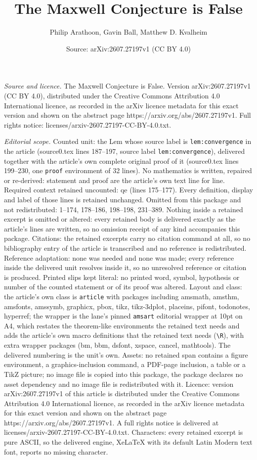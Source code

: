 \documentclass[10pt,a4paper]{amsart}
\title[The Maxwell Conjecture is False]{The Maxwell Conjecture is False}
\author{Philip Arathoon, Gavin Ball, Matthew D. Kvalheim}
\date{Source: arXiv:2607.27197v1 (CC BY 4.0)}
\begin{document}
\maketitle

\noindent\emph{Source and licence.} The Maxwell Conjecture is False. Version arXiv:2607.27197v1 (CC BY 4.0), distributed under the Creative Commons Attribution 4.0 International licence, as recorded in the arXiv licence metadata for this exact version and shown on the abstract page https://arxiv.org/abs/2607.27197v1. Full rights notice: licenses/arxiv-2607.27197-CC-BY-4.0.txt.\par\smallskip

\noindent\textit{Editorial scope.} Counted unit: the Lem whose source label is \texttt{lem:convergence} in the article (source0.tex lines 187--197, source label \texttt{lem:convergence}), delivered together with the article's own complete original proof of it (source0.tex lines 199--230, one \texttt{proof} environment of 32 lines). No mathematics is written, repaired or re-derived: statement and proof are the article's own text line for line. Required context retained uncounted: qe (lines 175--177). Every definition, display and label of those lines is retained unchanged. Omitted from this package and not redistributed: 1--174, 178--186, 198--198, 231--389. Nothing inside a retained excerpt is omitted or altered: every retained body is delivered exactly as the article's lines are written, so no omission receipt of any kind accompanies this package. Citations: the retained excerpts carry no citation command at all, so no bibliography entry of the article is transcribed and no reference is redistributed. Reference adaptation: none was needed and none was made; every reference inside the delivered unit resolves inside it, so no unresolved reference or citation is produced. Printed slips kept literal: no printed word, symbol, hypothesis or number of the counted statement or of its proof was altered. Layout and class: the article's own class is \texttt{article} with packages including amsmath, amsthm, amsfonts, amssymb, graphicx, pbox, tikz, tikz-3dplot, placeins, pifont, todonotes, hyperref; the wrapper is the lane's pinned \texttt{amsart} editorial wrapper at 10pt on A4, which restates the theorem-like environments the retained text needs and adds the article's own macro definitions that the retained text needs (\texttt{\textbackslash R}), with extra wrapper packages (bm, bbm, dsfont, xspace, cancel, mathtools). The delivered numbering is the unit's own. Assets: no retained span contains a figure environment, a graphics-inclusion command, a PDF-page inclusion, a table or a TikZ picture; no image file is copied into this package, the package declares no asset dependency and no image file is redistributed with it. Licence: version arXiv:2607.27197v1 of this article is distributed under the Creative Commons Attribution 4.0 International licence, as recorded in the arXiv licence metadata for this exact version and shown on the abstract page https://arxiv.org/abs/2607.27197v1. A full rights notice is delivered at licenses/arxiv-2607.27197-CC-BY-4.0.txt. Characters: every retained excerpt is pure ASCII, so the delivered engine, XeLaTeX with its default Latin Modern text font, reports no missing character.
\end{document}
